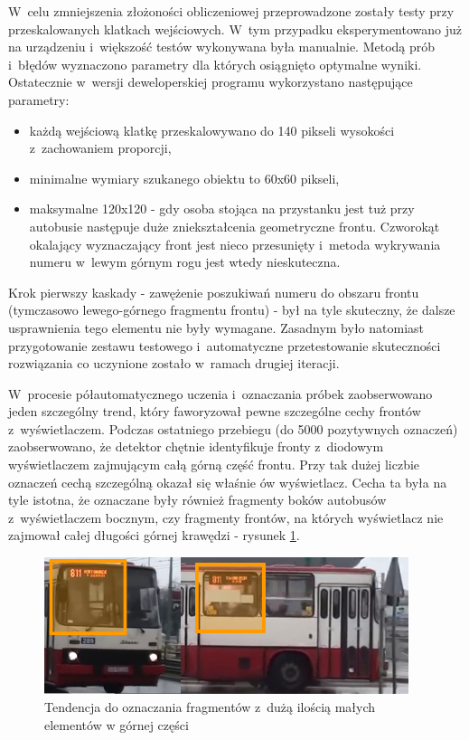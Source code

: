 W~celu zmniejszenia złożoności obliczeniowej przeprowadzone zostały
testy przy przeskalowanych klatkach wejściowych. W~tym przypadku
eksperymentowano już na urządzeniu i~większość testów wykonywana była
manualnie. Metodą prób i~błędów wyznaczono parametry dla których
osiągnięto optymalne wyniki. Ostatecznie w~wersji deweloperskiej 
programu wykorzystano następujące parametry:

\begin{itemize}
    \item każdą wejściową klatkę przeskalowywano do 140 pikseli wysokości
        z~zachowaniem proporcji,
    \item minimalne wymiary szukanego obiektu to 60x60 pikseli,
    \item maksymalne 120x120 - gdy osoba stojąca na przystanku jest tuż
        przy autobusie następuje duże zniekształcenia geometryczne
        frontu. Czworokąt okalający wyznaczający front jest nieco
        przesunięty i~metoda wykrywania numeru w~lewym górnym rogu jest
        wtedy nieskuteczna.
\end{itemize}

Krok pierwszy kaskady - zawężenie poszukiwań numeru do obszaru frontu
(tymczasowo lewego-górnego fragmentu frontu) - był na tyle skuteczny,
że dalsze usprawnienia tego elementu nie były wymagane. Zasadnym było
natomiast przygotowanie zestawu testowego i~automatyczne 
przetestowanie skuteczności rozwiązania co uczynione 
zostało w~ramach drugiej iteracji.

W~procesie półautomatycznego uczenia i~oznaczania
próbek
zaobserwowano jeden szczególny trend, który faworyzował pewne
szczególne cechy frontów z~wyświetlaczem. Podczas ostatniego przebiegu
(do 5000 pozytywnych oznaczeń) zaobserwowano, że detektor
chętnie identyfikuje fronty z~diodowym wyświetlaczem zajmującym 
całą górną część frontu. Przy tak dużej liczbie oznaczeń
cechą szczególną okazał się właśnie ów wyświetlacz. Cecha ta była
na tyle istotna, że oznaczane były również fragmenty boków autobusów
z~wyświetlaczem bocznym, czy fragmenty frontów, na których wyświetlacz
nie zajmował całej długości górnej krawędzi - rysunek
\ref{fig:frontdetectormorph}.

\begin{figure}[!h]
    \centering
    \includegraphics[width=0.95\textwidth]{img/exp_front_detector_curiosity}
    \caption{Tendencja do oznaczania fragmentów z~dużą ilością
    małych elementów w górnej części}
    \label{fig:frontdetectormorph}
\end{figure}

